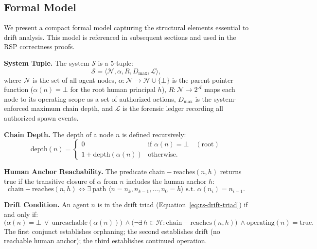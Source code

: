 \subsection{Formal Model}
\label{sec:rs-drift-model}

We present a compact formal model capturing the structural elements essential to drift analysis. This model is referenced in subsequent sections and used in the RSP correctness proofs.

\medskip
\noindent\textbf{System Tuple.}
The system $\mathcal{S}$ is a 5-tuple:
\begin{equation}
\mathcal{S} = \langle \mathcal{N}, \alpha, R, D_{\max}, \mathcal{L} \rangle,
\label{eq:rs-system-model}
\end{equation}
where $\mathcal{N}$ is the set of all agent nodes, $\alpha: \mathcal{N} \rightarrow \mathcal{N} \cup \{\bot\}$ is the parent pointer function ($\alpha(n) = \bot$ for the root human principal $h$), $R: \mathcal{N} \rightarrow 2^{\mathcal{A}}$ maps each node to its operating scope as a set of authorized actions, $D_{\max}$ is the system-enforced maximum chain depth, and $\mathcal{L}$ is the forensic ledger recording all authorized spawn events.

\medskip
\noindent\textbf{Chain Depth.}
The depth of a node $n$ is defined recursively:
\begin{equation}
\mathrm{depth}(n) = 
\begin{cases}
0 & \text{if } \alpha(n) = \bot \quad (\text{root}) \\
1 + \mathrm{depth}(\alpha(n)) & \text{otherwise}.
\end{cases}
\label{eq:rs-depth}
\end{equation}

\medskip
\noindent\textbf{Human Anchor Reachability.}
The predicate $\mathrm{chain-reaches}(n, h)$ returns true if the transitive closure of $\alpha$ from $n$ includes the human anchor $h$:
\begin{equation}
\mathrm{chain-reaches}(n, h) \iff \exists\ \text{path } \langle n = n_k, n_{k-1}, \ldots, n_0 = h \rangle \text{ s.t. } \alpha(n_i) = n_{i-1}.
\label{eq:rs-chain-reaches}
\end{equation}

\medskip
\noindent\textbf{Drift Condition.}
An agent $n$ is in the drift triad (Equation~\ref{eq:rs-drift-triad}) if and only if:
\begin{equation}
\bigl( \alpha(n) = \bot \ \lor \ \mathrm{unreachable}(\alpha(n)) \bigr)\ \land \bigl( \neg\exists\, h \in \mathcal{H} : \mathrm{chain-reaches}(n, h) \bigr)\ \land \mathrm{operating}(n) = \mathrm{true}.
\label{eq:rs-drift-condition}
\end{equation}
The first conjunct establishes orphaning; the second establishes drift (no reachable human anchor); the third establishes continued operation.

